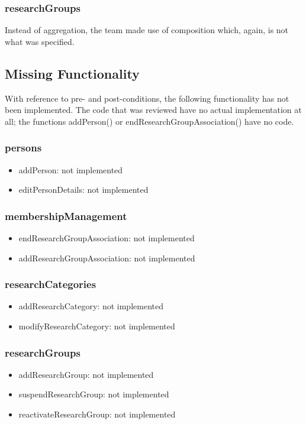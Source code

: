 \documentclass{article}
\begin{document}
\subsubsection{researchGroups}

Instead of aggregation, the team made use of composition which, again, is not what was specified.


\subsection{Missing Functionality}

With reference to pre- and post-conditions, the following functionality has not been implemented. The code that was reviewed have no actual implementation at all; the functions addPerson() or endResearchGroupAssociation() have no code.

\subsubsection{persons} 
\begin{itemize}
	\item addPerson: not implemented
	\item editPersonDetails: not implemented
\end{itemize}

\subsubsection{membershipManagement}
\begin{itemize}
	\item endResearchGroupAssociation: not implemented
	\item addResearchGroupAssociation: not implemented
\end{itemize}

\subsubsection{researchCategories}
\begin{itemize}
	\item addResearchCategory: not implemented
	\item modifyResearchCategory: not implemented
\end{itemize}

\subsubsection{researchGroups}
\begin{itemize}
	\item addResearchGroup: not implemented
	\item suspendResearchGroup: not implemented
	\item reactivateResearchGroup: not implemented
\end{itemize}
\end{document}
